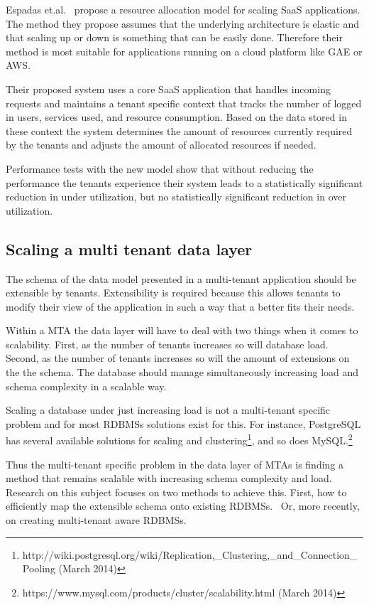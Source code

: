 Espadas et.al.~\cite{espadas2013tenant} propose a resource allocation model for scaling SaaS applications.
The method they propose assumes that the underlying architecture is elastic and that scaling up or down is something that can be easily done.
Therefore their method is most suitable for applications running on a cloud platform like \ac{GAE} or \ac{AWS}. 

Their proposed system uses a core SaaS application that handles incoming requests and maintains a tenant specific context that tracks the number of logged in users, services used, and resource consumption.
Based on the data stored in these context the system determines the amount of resources currently required by the tenants and adjusts the amount of allocated resources if needed.

Performance tests with the new model show that without reducing the performance the tenants experience their system leads to a statistically significant reduction in under utilization, but no statistically significant reduction in over utilization. 


\subsection{Scaling a multi tenant data layer}
The schema of the data model presented in a multi-tenant application should be extensible by tenants.
Extensibility is required because this allows tenants to modify their view of the application in such a way that a better fits their needs.

Within a \ac{MTA} the data layer will have to deal with two things when it comes to scalability.
First, as the number of tenants increases so will database load.
Second, as the number of tenants increases so will the amount of extensions on the the schema.
The database should  manage simultaneously increasing load and schema complexity in a scalable way.

Scaling a database under just increasing load is not a multi-tenant specific problem and for most \acp{RDBMS} solutions exist for this. 
For instance, PostgreSQL has several available solutions for scaling and clustering\footnote{http://wiki.postgresql.org/wiki/Replication,\_Clustering,\_and\_Connection\_Pooling (March 2014)}, and so does MySQL.\footnote{https://www.mysql.com/products/cluster/scalability.html (March 2014)}

Thus the multi-tenant specific problem in the data layer of \acp{MTA} is finding a method that remains scalable with increasing schema complexity and load.
Research on this subject focuses on two methods to achieve this.
First, how to efficiently map the extensible schema onto existing \acp{RDBMS}.~\cite{aulbach2008multi, aulbach2009comparison} 
Or, more recently, on creating multi-tenant aware \acp{RDBMS}.~\cite{schiller2011native, aulbach2011extensibility} 

